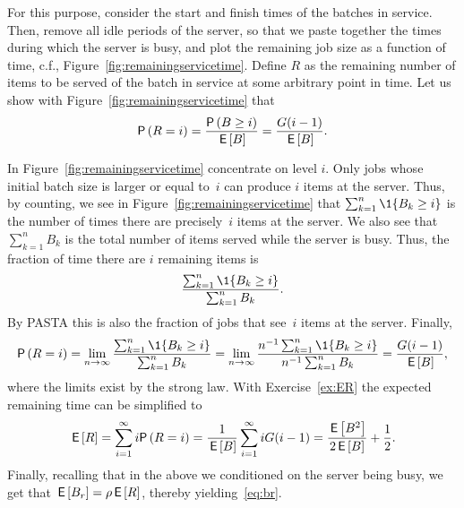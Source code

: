 For this purpose, consider  the start and finish times of the batches in service.  Then, remove all idle periods of the server, so that we paste together the times during which the server is busy, and plot the remaining job size as a function of time, 
c.f., Figure~\ref{fig:remainingservicetime}.  Define $R$ as the
remaining number of items to be served of the batch in service at some
arbitrary point in time. Let us show with Figure~\ref{fig:remainingservicetime} that
\begin{equation*}
  \P{R=i} =\frac{\P{B\geq i}}{\E B} = \frac{G(i-1)}{\E B}.
\end{equation*}

In Figure~\ref{fig:remainingservicetime} concentrate on level
$i$. Only jobs whose initial batch size is larger or equal to~$i$ can
produce  $i$ items at the server.
Thus, by counting, we see in Figure~\ref{fig:remainingservicetime}
that $\sum_{k=1}^n \1{B_k \geq i}$ is the number of times there are
precisely~$i$  items at the server.  We also see that $\sum_{k=1}^n B_k$ is
the total number of items served while the server is busy. Thus, the fraction of time there
are $i$ remaining items is
\begin{equation*}
  \frac{\sum_{k=1}^n \1{B_k \geq i}}{\sum_{k=1}^n B_k}.
\end{equation*}
By PASTA this is also the fraction of jobs that see~$i$ items at the server.  Finally, 
\begin{equation*}
\P{R=i} = \lim_{n\to\infty} \frac{\sum_{k=1}^n \1{B_k \geq i}}{\sum_{k=1}^n B_k} 
= \lim_{n\to\infty}  \frac{n^{-1}\sum_{k=1}^n \1{B_k \geq i}}{n^{-1}\sum_{k=1}^n B_k} = \frac{G(i-1)}{\E B},
\end{equation*}
where  the limits exist by the strong law. With  Exercise~\ref{ex:ER} 
the expected remaining time can be simplified to
\begin{equation*}
  \E{R} 
= \sum_{i=1}^\infty i \P{R=i} = \frac1{\E B}\sum_{i=1}^\infty i G(i-1) 
= \frac{\E{B^2}}{2\E B} + \frac{1}2.
\end{equation*}
Finally, recalling that in the above we conditioned on the server
being busy, we get that $\,\mathsf{E}\left[B_r\right] = \rho \,\mathsf{E}\left[R\right]$, thereby yielding~\eqref{eq:br}.

